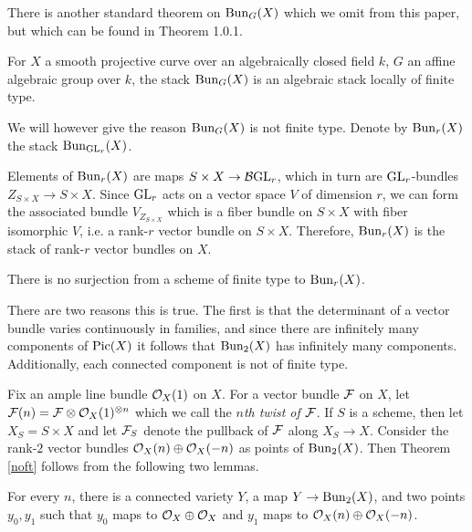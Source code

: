 \documentclass[12pt]{article}
\begin{document}
There is another standard theorem on $\operatorname{Bun}_G(X)$ which we omit from this paper, but which can be found in \cite{Wang} Theorem 1.0.1.

\begin{thm}
    For $X$ a smooth projective curve over an algebraically closed field $k$, $G$ an affine algebraic group over $k$, the stack $\operatorname{Bun}_G(X)$ is an algebraic stack locally of finite type.
\end{thm}

We will however give the reason $\operatorname{Bun}_G(X)$ is not finite type. Denote by $\operatorname{Bun}_r(X)$ the stack $\operatorname{Bun}_{\operatorname{GL}_r}(X)$.

\begin{rem}
Elements of $\operatorname{Bun}_r(X)$ are maps $S \times X \to \mathcal{B}\text{GL}_r$, which in turn are $\operatorname{GL}_r$-bundles $Z_{S \times X} \to S \times X$. Since $\operatorname{GL}_r$ acts on a vector space $V$ of dimension $r$, we can form the associated bundle $V_{Z_{S \times X}}$ which is a fiber bundle on $S \times X$ with fiber isomorphic $V$, i.e. a rank-$r$ vector bundle on $S \times X$. Therefore, $\operatorname{Bun}_r(X)$ is the stack of rank-$r$ vector bundles on $X$.
\end{rem}

\begin{thm}\label{noft}
    There is no surjection from a scheme of finite type to $\operatorname{Bun}_r(X)$.
\end{thm}

There are two reasons this is true. The first is that the determinant of a vector bundle varies continuously in families, and since there are infinitely many components of $\operatorname{Pic}(X)$ it follows that $\operatorname{Bun}_2(X)$ has infinitely many components. Additionally, each connected component is not of finite type.

Fix an ample line bundle $\mathcal{O}_X(1)$ on $X$. For a vector bundle $\mathcal{F}$ on $X$, let $\mathcal{F}(n) = \mathcal{F} \otimes \mathcal{O}_X(1)^{\otimes n}$ which we call the \textit{$n$th twist of $\mathcal{F}$}. If $S$ is a scheme, then let $X_S = S \times X$ and let $\mathcal{F}_S$ denote the pullback of $\mathcal{F}$ along $X_S \to X$. Consider the rank-$2$ vector bundles $\mathcal{O}_X(n) \oplus \mathcal{O}_X(-n)$ as points of $\operatorname{Bun}_2(X)$. Then Theorem \ref{noft} follows from the following two lemmas.

\begin{lem}\label{bun2conn}
    For every $n$, there is a connected variety $Y$, a map $Y \to \operatorname{Bun}_2(X)$, and two points $y_0,y_1$ such that $y_0$ maps to $\mathcal{O}_X \oplus \mathcal{O}_X$ and $y_1$ maps to $\mathcal{O}_X(n) \oplus \mathcal{O}_X(-n)$.
\end{lem}
\end{document}
